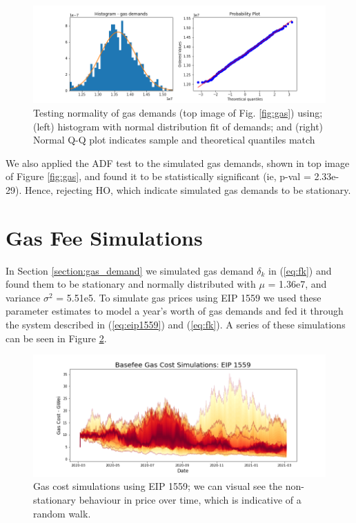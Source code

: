 \documentclass{article}
\begin{document}
\begin{figure}
\centering
\includegraphics[width=5in]{gaussian_analysis.png}
\caption{Testing normality of gas demands (top image of Fig. \ref{fig:gas}) using; (left) histogram with normal distribution fit of demands; and (right) Normal Q-Q plot indicates sample and theoretical quantiles match} 
\label{fig:eda}
\end{figure} 

We also applied the ADF test to the simulated gas demands, shown in top image of Figure \ref{fig:gas}, and found it to be statistically significant (ie, p-val = 2.33e-29). Hence, rejecting HO, which indicate simulated gas demands to be stationary. 


\section{Gas Fee Simulations}
\label{section:gas_fees}

In Section \ref{section:gas_demand} we simulated gas demand  $\delta_{k}$ in (\ref{eq:fk}) and found them to be stationary and normally distributed with $\mu$ = 1.36e7, and variance $\sigma^2$ = 5.51e5. To simulate gas prices using EIP 1559 we used these parameter estimates to model a year's worth of gas demands and fed it through the system described in (\ref{eq:eip1559}) and (\ref{eq:fk}). A series of these simulations can be seen in Figure \ref{fig:basefee_simulations}.

\begin{figure}
\centering
\includegraphics[width=5in]{basefee_simulations.png}
\caption{Gas cost simulations using EIP 1559; we can visual see the non-stationary behaviour in price over time, which is indicative of a random walk.}  
\label{fig:basefee_simulations}
\end{figure} 
\end{document}
